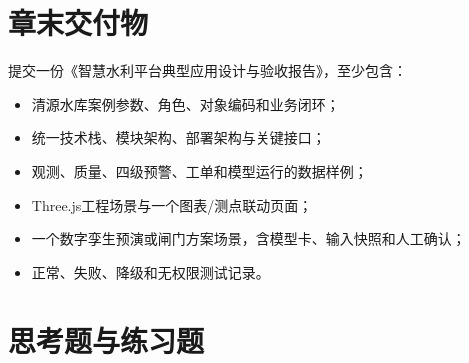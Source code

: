 \section*{章末交付物}

提交一份《智慧水利平台典型应用设计与验收报告》，至少包含：

\begin{itemize}
\item 清源水库案例参数、角色、对象编码和业务闭环；
\item 统一技术栈、模块架构、部署架构与关键接口；
\item 观测、质量、四级预警、工单和模型运行的数据样例；
\item Three.js工程场景与一个图表/测点联动页面；
\item 一个数字孪生预演或闸门方案场景，含模型卡、输入快照和人工确认；
\item 正常、失败、降级和无权限测试记录。
\end{itemize}

\section*{思考题与练习题}

